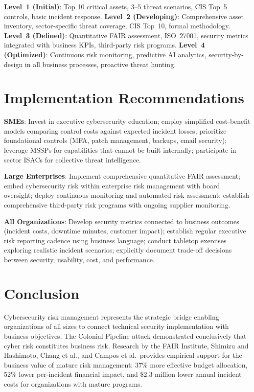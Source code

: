 \documentclass[journal]{IEEEtran}
\begin{document}
\textbf{Level~1 (Initial)}: Top 10 critical assets, 3--5 threat scenarios, CIS Top~5
controls, basic incident response. \textbf{Level~2 (Developing)}: Comprehensive asset
inventory, sector-specific threat coverage, CIS Top~10, formal methodology.
\textbf{Level~3 (Defined)}: Quantitative FAIR assessment, ISO~27001, security metrics
integrated with business KPIs, third-party risk programs. \textbf{Level~4 (Optimized)}:
Continuous risk monitoring, predictive AI analytics, security-by-design in all business
processes, proactive threat hunting.

\section{Implementation Recommendations}

\textbf{SMEs}: Invest in executive cybersecurity education; employ simplified
cost-benefit models comparing control costs against expected incident losses; prioritize
foundational controls (MFA, patch management, backups, email security); leverage MSSPs
for capabilities that cannot be built internally; participate in sector ISACs for
collective threat intelligence.

\textbf{Large Enterprises}: Implement comprehensive quantitative FAIR assessment; embed
cybersecurity risk within enterprise risk management with board oversight; deploy
continuous monitoring and automated risk assessment; establish comprehensive third-party
risk programs with ongoing supplier monitoring.

\textbf{All Organizations}: Develop security metrics connected to business outcomes
(incident costs, downtime minutes, customer impact); establish regular executive
risk reporting cadence using business language; conduct tabletop exercises exploring
realistic incident scenarios; explicitly document trade-off decisions between security,
usability, cost, and performance.

\section{Conclusion}

Cybersecurity risk management represents the strategic bridge enabling organizations of
all sizes to connect technical security implementation with business objectives. The
Colonial Pipeline attack demonstrated conclusively that cyber risk constitutes business
risk. Research by the FAIR Institute, Shimizu and Hashimoto, Chang et al., and Campos
et al.\ provides empirical support for the business value of mature risk management:
37\% more effective budget allocation, 52\% lower per-incident financial impact, and
\$2.3 million lower annual incident costs for organizations with mature programs.
\end{document}
